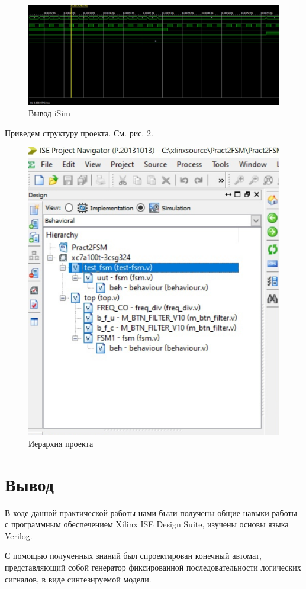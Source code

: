 \documentclass[a4paper,14pt]{extarticle}
\begin{document}
\begin{figure}[htpb]
	\centering
	\includegraphics[width=\linewidth]{images/test-result2.3}
	\caption{Вывод iSim }
	\label{fig:test-result2}
\end{figure}
Приведем структуру проекта. См. рис. \ref{fig:file-tree}.
\begin{figure}[htpb]
	\centering
	\includegraphics[width=0.4\linewidth]{images/file-tree}
	\caption{Иерархия проекта }
	\label{fig:file-tree}
\end{figure}

\newpage
\section{Вывод}
В ходе данной практической работы нами были получены общие навыки работы с программным обеспечением Xilinx ISE Design Suite, изучены основы языка Verilog.

С помощью полученных знаний был спроектирован конечный автомат, представляющий собой генератор
фиксированной последовательности логических сигналов, в виде синтезируемой модели.
\end{document}
